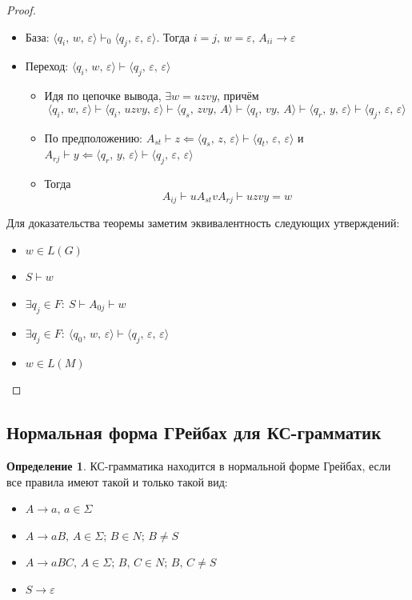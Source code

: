 \documentclass[a4paper,12pt]{article}
\theoremstyle{plain}
\theoremstyle{definition}
\newtheorem{definition}{Определение}[subsection]
\theoremstyle{remark}
\begin{document}
\begin{proof}
\begin{itemize}
		\item База: $\langle q_i,\, w,\, \varepsilon\rangle \vdash_0\langle q_j,\, \varepsilon,\, \varepsilon\rangle$. Тогда $i = j,\, w =\varepsilon,\, A_{ii} \to \varepsilon$
		\item Переход: $\langle q_i,\, w,\, \varepsilon\rangle\vdash\langle q_j,\, \varepsilon,\, \varepsilon\rangle$
		      \begin{itemize}
			      \item Идя по цепочке вывода, $\exists w = uzvy$, причём
			            \[
				            \langle q_i,\, w,\, \varepsilon\rangle \vdash \langle q_i,\, uzvy,\, \varepsilon\rangle \vdash \langle q_s,\, zvy,\, A\rangle \vdash \langle q_t,\, vy,\, A\rangle \vdash \langle q_r,\, y,\, \varepsilon\rangle \vdash \langle q_j,\, \varepsilon,\, \varepsilon\rangle
			            \]
			      \item По предположению: $A_{st} \vdash z \Leftarrow \langle q_s,\, z,\, \varepsilon\rangle \vdash\langle q_t,\, \varepsilon,\, \varepsilon\rangle$ и $A_{rj} \vdash y \Leftarrow \langle q_r,\, y,\, \varepsilon\rangle\vdash\langle q_j,\, \varepsilon,\, \varepsilon\rangle$
			      \item Тогда
			            \[
				            A_{ij} \vdash uA_{st}vA_{rj} \vdash uzvy = w
			            \]
		      \end{itemize}
	\end{itemize}
	Для доказательства теоремы заметим эквивалентность следующих утверждений:
	\begin{itemize}
		\item $w \in L(G)$
		\item $S \vdash w$
		\item $\exists q_j \in F :\: S \vdash A_{0j} \vdash w$
		\item $\exists q_j \in F :\: \langle q_0,\,w,\,\varepsilon\rangle\vdash\langle q_j,\,\varepsilon,\,\varepsilon\rangle$
		\item $w \in L(M)$
	\end{itemize}
\end{proof}

\subsection{Нормальная форма ГРейбах для КС-грамматик}
\begin{definition}
	КС-грамматика находится в нормальной форме Грейбах, если все правила имеют такой и только такой вид:
	\begin{itemize}
		\item $A \to a,\, a \in \Sigma$
		\item $A \to aB,\, A \in \Sigma;\, B \in N;\, B \neq S$
		\item $A \to aBC,\, A \in \Sigma;\, B,\, C \in N;\, B,\, C \neq S$
		\item $S \to \varepsilon$
	\end{itemize}
\end{definition}
\end{document}
